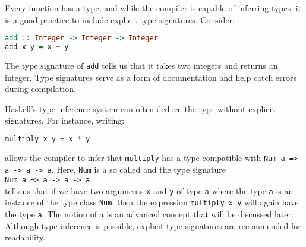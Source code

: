 Every function has a type, and while the compiler is capable of inferring types, it is a good practice to include explicit type signatures. Consider:
\begin{lstlisting}[style=haskellstyle, language=Haskell]
add :: Integer -> Integer -> Integer
add x y = x + y
\end{lstlisting}
The type signature of \texttt{add} tells us that it takes two integers and returns an integer. Type signatures
serve as a form of documentation and help catch errors during compilation. 

Haskell’s type inference system can often deduce the type without explicit signatures. For instance, writing:
\begin{lstlisting}[style=haskellstyle, language=Haskell]
multiply x y = x * y
\end{lstlisting}
allows the compiler to infer that \texttt{multiply} has a type compatible with \texttt{Num a => a -> a -> a}.
Here, \texttt{Num} is a so called  and the type signature
\\[0.2cm]
\hspace*{1.3cm}
\texttt{Num a => a -> a -> a}
\\[0.2cm]
tells us that if we have two arguments \texttt{x} and \texttt{y} of type \texttt{a} where the type \texttt{a}
is an instance of the type class \texttt{Num}, then the expression \texttt{multiply x y} will again have the
type \texttt{a}.  The notion of a  is an advanced concept that will be discussed later. 
Although type inference is possible, explicit type signatures are recommended for readability.

